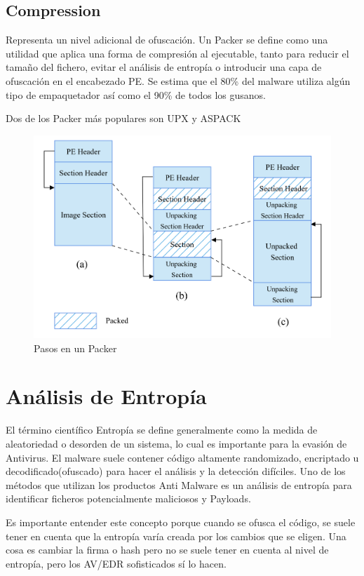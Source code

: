 \documentclass[15pt]{article}
\begin{document}
	\subsection{Compression}
	Representa un nivel adicional de ofuscación. Un Packer se define como una utilidad que aplica una forma de compresión al ejecutable, tanto para reducir el tamaño del fichero, evitar el análisis de entropía o introducir una capa de ofuscación en el encabezado PE. Se estima que el 80\% del malware utiliza algún tipo de empaquetador así como el 90\% de todos los gusanos.
	
	Dos de los Packer más populares son UPX \cite{upx} y ASPACK \cite{aspack}
	
	\begin{figure}[H]
		\centering
		\includegraphics[width=12cm]{images/packer.png}
		\caption{Pasos en un Packer}
	\end{figure}

	
	\newpage
	\section{Análisis de Entropía}
	El término científico Entropía se define generalmente como la medida de aleatoriedad o desorden de un sistema, lo cual es importante para la evasión de Antivirus. El malware suele contener código altamente randomizado, encriptado u decodificado(ofuscado) para hacer el análisis y la detección difíciles. Uno de los métodos que utilizan los productos Anti Malware es un análisis de entropía para identificar ficheros potencialmente maliciosos y Payloads.
	
	Es importante entender este concepto porque cuando se ofusca el código, se suele tener en cuenta que la entropía varía creada por los cambios que se eligen. Una cosa es cambiar la firma o hash pero no se suele tener en cuenta al nivel de entropía, pero los AV/EDR sofisticados sí lo hacen.
	
\end{document}
